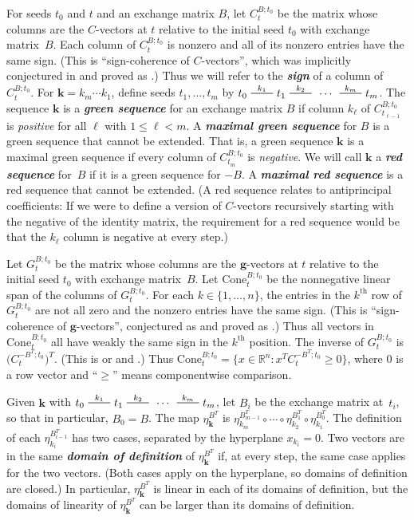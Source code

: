\documentclass{amsart}
\theoremstyle{definition}
\theoremstyle{remark}
\numberwithin{equation}{section}
\newcommand{\newword}[1]{\textbf{\emph{#1}}}
\newcommand{\reals}{\mathbb R}
\newcommand{\edge}{\,\,\rule[2.7pt]{20pt}{0.5pt}\,\,}
\newcommand{\set}[1]{{\lbrace #1 \rbrace}}
\newcommand{\sett}[1]{{\bigl\lbrace #1 \bigr\rbrace}}
\renewcommand{\th}{^\text{th}}
\newcommand{\0}{{\mathbf{0}}}
\newcommand{\Cone}{\mathrm{Cone}}
\newcommand{\g}{\mathbf{g}}
\newcommand{\kk}{\mathbf{k}}
\renewcommand{\th}{^\text{th}}
\begin{document}
For seeds $t_0$ and $t$ and an exchange matrix $B$, let $C_t^{B;t_0}$ be the matrix whose columns are the $C$-vectors at $t$ relative to the initial seed $t_0$ with exchange matrix~$B$.
Each column of $C_t^{B;t_0}$ is nonzero and all of its nonzero entries have the same sign.
(This is ``sign-coherence of $C$-vectors'', which was implicitly conjectured in \cite{FZ07} and proved as \cite[Corollary~5.5]{GHKK18}.)
Thus we will refer to the \newword{sign} of a column of $C_t^{B;t_0}$.
For $\kk=k_m\cdots k_1$, define seeds $t_1,\ldots,t_m$ by $t_0\overset{k_1}{\edge}t_1\overset{k_2}{\edge}\,\cdots\,\overset{k_m}{\edge}t_m$.
The sequence $\kk$ is a \newword{green sequence} for an exchange matrix $B$ if column $k_\ell$ of $C_{t_{\ell-1}}^{B;t_0}$ is \emph{positive} for all $\ell$ with $1\le\ell<m$.
A \newword{maximal green sequence} for $B$ is a green sequence that cannot be extended.
That is, a green sequence $\kk$ is a maximal green sequence if every column of $C_{t_m}^{B;t_0}$ is \emph{negative}.
We will call $\kk$ a \newword{red sequence} for~$B$ if it is a green sequence for $-B$.
A \newword{maximal red sequence} is a red sequence that cannot be extended.
(A red sequence relates to antiprincipal coefficients: 
If we were to define a version of $C$-vectors recursively starting with the negative of the identity matrix, the requirement for a red sequence would be that the $k_\ell$ column is negative at every step.)

Let $G_t^{B;t_0}$ be the matrix whose columns are the $\g$-vectors at $t$ relative to the initial seed $t_0$ with exchange matrix~$B$.
Let $\Cone^{B;t_0}_t$ be the nonnegative linear span of the columns of $G_t^{B;t_0}$.
For each $k\in\set{1,\ldots,n}$, the entries in the $k\th$ row of $G_t^{B;t_0}$ are not all zero and the nonzero entries have the same sign.
(This is ``sign-coherence of $\g$-vectors'', conjectured as \cite[Conjecture~6.13]{FZ07} and proved as \cite[Theorem 5.11]{GHKK18}.)
Thus all vectors in $\Cone^{B;t_0}_t$ all have weakly the same sign in the $k\th$ position.
The inverse of $G_t^{B;t_0}$ is $\bigl(C_t^{-B^T;t_0}\bigr)^T$.
(This is \cite[Theorem~1.2]{NZ12} or \cite[Theorem~1.1]{RS16} and \cite[Theorem~3.30]{RS16}.)
Thus $\Cone^{B;t_0}_t=\sett{x\in\reals^n:x^TC_t^{-B^T;t_0}\ge0}$, where $0$ is a row vector and ``$\ge$'' means componentwise comparison. 

Given $\kk$ with $t_0\overset{k_1}{\edge}t_1\overset{k_2}{\edge}\,\cdots\,\overset{k_m}{\edge}t_m$, let $B_i$ be the exchange matrix at~$t_i$, so that in particular, $B_0=B$.
The map $\eta_{\kk}^{B^T}$ is ${\eta_{k_m}^{B_{m-1}^T}\circ\cdots\circ\eta_{k_2}^{B_1^T}\circ\eta_{k_1}^{B_0^T}}$.
The definition of each $\eta_{k_i}^{B_{i-1}^T}$ has two cases, separated by the hyperplane $x_{k_i}=0$.
Two vectors are in the same \newword{domain of definition} of $\eta_\kk^{B^T}$ if, at every step, the same case applies for the two vectors.
(Both cases apply on the hyperplane, so domains of definition are closed.)
In particular, $\eta_\kk^{B^T}$ is linear in each of its domains of definition, but the domains of linearity of $\eta_\kk^{B^T}$ can be larger than its domains of definition.
\end{document}
